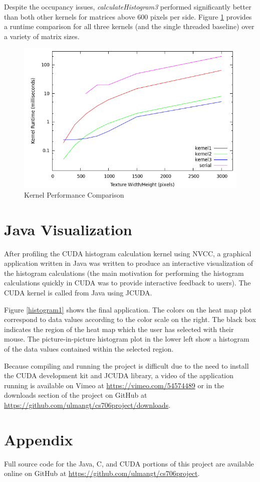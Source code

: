 \documentclass{article}
\begin{document}
Despite the occupancy issues, \emph{calculateHistogram3} performed significantly better than both other kernels for matrices above 600 pixels per side. Figure \ref{comparison1} provides a runtime comparison for all three kernels (and the single threaded baseline) over a variety of matrix sizes.

\begin{figure}
\centering
\includegraphics[width=1.0\textwidth]{screenshots/performance.png}
\caption{Kernel Performance Comparison}
\label{comparison1}
\end{figure}

\section{Java Visualization}\label{visualization}

After profiling the CUDA histogram calculation kernel using NVCC, a graphical application written in Java was written to produce an interactive visualization of the histogram calculations (the main motivation for performing the histogram calculations quickly in CUDA was to provide interactive feedback to users). The CUDA kernel is called from Java using JCUDA\cite{jcuda}.

Figure \ref{histogram1} shows the final application. The colors on the heat map plot correspond to data values according to the color scale on the right. The black box indicates the region of the heat map which the user has selected with their mouse. The picture-in-picture histogram plot in the lower left show a histogram of the data values contained within the selected region.

Because compiling and running the project is difficult due to the need to install the CUDA development kit and JCUDA library, a video of the application running is available on Vimeo at \url{https://vimeo.com/54574489} or in the downloads section of the project on GitHub at \url{https://github.com/ulmangt/cs706project/downloads}.

\section{Appendix}\label{appendix}

Full source code for the Java, C, and CUDA portions of this project are available online on GitHub at \url{https://github.com/ulmangt/cs706project}.



\end{document}
